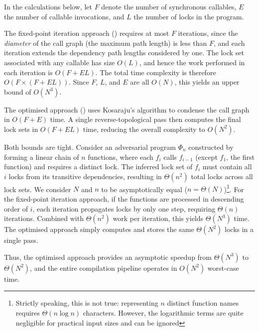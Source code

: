In the calculations below, let $F$ denote the number of synchronous callables, $E$ the number of callable invocations, and $L$ the number of locks in the program.

The fixed-point iteration approach () requires at most $F$ iterations, since the \textit{diameter} of the call graph (the maximum path length) is less than $F$, and each iteration extends the dependency path lengths considered by one. The lock set associated with any callable has size $O(L)$, and hence the work performed in each iteration is $O(F + EL)$. The total time complexity is therefore $O(F \times (F + EL))$. Since $F$, $L$, and $E$ are all $O(N)$, this yields an upper bound of $O(N^3)$.

The optimised approach () uses Kosaraju's algorithm to condense the call graph in $O(F + E)$ time. A single reverse-topological pass then computes the final lock sets in $O(F + EL)$ time, reducing the overall complexity to $O(N^2)$.

Both bounds are tight. Consider an adversarial program $\Phi_n$ constructed by forming a linear chain of $n$ functions, where each $f_i$ calls $f_{i - 1}$ (except $f_1$, the first function) and requires a distinct lock. The inferred lock set of $f_i$ must contain all $i$ locks from its transitive dependencies, resulting in $\Theta(n^2)$ total locks across all lock sets. We consider $N$ and $n$ to be asymptotically equal ($n = \Theta(N)$)\footnote{Strictly speaking, this is not true: representing $n$ distinct function names requires $\Theta(n \log n)$ characters. However, the logarithmic terms are quite negligible for practical input sizes and can be ignored}. For the fixed-point iteration approach, if the functions are processed in descending order of $i$, each iteration propagates locks by only one step, requiring $\Theta(n)$ iterations. Combined with $\Theta(n^2)$ work per iteration, this yields $\Theta(N^3)$ time. The optimised approach simply computes and stores the same $\Theta(N^2)$ locks in a single pass.

Thus, the optimised approach provides an asymptotic speedup from $\Theta(N^3)$ to $\Theta(N^2)$, and the entire compilation pipeline operates in $O(N^2)$ worst-case time.

